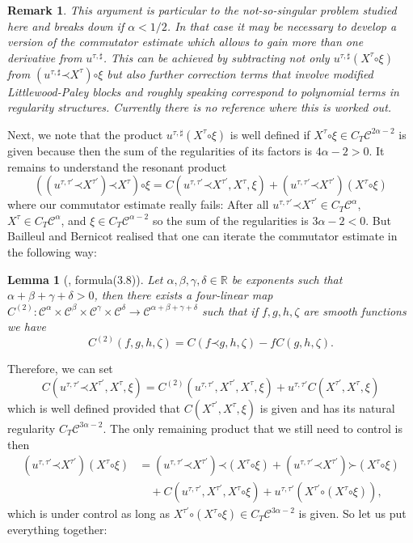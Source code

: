 \documentclass[a4paper, 11pt]{article}
\newtheorem{lemma}[theorem]{Lemma}
\newtheorem{remark}[theorem]{Remark}
\newcommand{\para}{\mathord{\prec}}
\newcommand{\lpara}{\mathord{\succ}}
\newcommand{\reso}{\mathord{\circ}}
\begin{document}
\begin{remark}
  \label{rmk:too-little-gain}This argument is particular to the
  not-so-singular problem studied here and breaks down if $\alpha < 1 / 2$. In
  that case it may be necessary to develop a version of the commutator estimate
  which allows to gain more than one derivative from $u^{\tau, \sharp}$. This
  can be achieved by subtracting not only $u^{\tau, \sharp} (X^{\tau} \reso
  \xi)$ from $(u^{\tau, \sharp} \para X^{\tau}) \reso \xi$ but also further
  correction terms that involve modified Littlewood-Paley blocks
  and roughly speaking correspond to polynomial terms in regularity
  structures. Currently there is no reference where this is worked out.
\end{remark}

Next, we note that the product $u^{\tau, \sharp} (X^{\tau} \reso \xi)$ is
well defined if $X^{\tau} \reso \xi \in C_T \mathcal{C}^{2 \alpha - 2}$ is
given because then the sum of the regularities of its factors is $4 \alpha - 2
> 0$. It remains to understand the resonant product
\[ ((u^{\tau, \tau'} \para X^{\tau'}) \para X^{\tau}) \reso \xi = C (u^{\tau,
   \tau'} \para X^{\tau'}, X^{\tau}, \xi) + (u^{\tau, \tau'} \para X^{\tau'})
   (X^{\tau} \reso \xi) \]
where our commutator estimate really fails: After all $u^{\tau, \tau'} \para X^{\tau'} \in C_T \mathcal{C}^{\alpha}$,
$X^{\tau} \in C_T \mathcal{C}^{\alpha}$, and $\xi \in C_T \mathcal{C}^{\alpha
- 2}$ so the sum of the regularities is $3 \alpha - 2 < 0$. But Bailleul and
Bernicot realised that one can iterate the commutator estimate in the
following way:

\begin{lemma}[\cite{bailleul_higher_2016}, formula(3.8)]  
  Let $\alpha, \beta, \gamma, \delta \in \mathbb{R}$ be exponents such that $\alpha + \beta + \gamma + \delta > 0$, then
  there exists a four-linear map $C^{(2)} : \mathcal{C}^{\alpha} \times
  \mathcal{C}^{\beta} \times \mathcal{C}^{\gamma} \times \mathcal{C}^{\delta}
  \rightarrow \mathcal{C}^{\alpha + \beta + \gamma + \delta}$ such that if $f,
  g, h, \zeta$ are smooth functions we have
  \[ C^{(2)} (f, g, h, \zeta) = C (f \para g, h, \zeta) - f C (g, h, \zeta) .
  \]
\end{lemma}

Therefore, we can set
\[ C (u^{\tau, \tau'} \para X^{\tau'}, X^{\tau}, \xi) = C^{(2)} (u^{\tau,
   \tau'}, X^{\tau'}, X^{\tau}, \xi) + u^{\tau, \tau'} C (X^{\tau'}, X^{\tau},
   \xi) \]
which is well defined provided that $C (X^{\tau'}, X^{\tau}, \xi)$ is given and has its natural
regularity $C_T \mathcal{C}^{3 \alpha - 2}$. The only remaining product that
we still need to control is then
\begin{align*}
  (u^{\tau, \tau'} \para X^{\tau'}) (X^{\tau} \reso \xi) & = (u^{\tau, \tau'}
  \para X^{\tau'}) \para (X^{\tau} \reso \xi) + (u^{\tau, \tau'} \para
  X^{\tau'}) \lpara (X^{\tau} \reso \xi)\\
  & \quad + C (u^{\tau, \tau'}, X^{\tau'}, X^{\tau} \reso \xi) + u^{\tau, \tau'}
  (X^{\tau'} \reso (X^{\tau} \reso \xi)),
\end{align*}
which is under control as long as $X^{\tau'} \reso (X^{\tau} \reso \xi) \in
C_T \mathcal{C}^{3 \alpha - 2}$ is given. So let us put everything together:
\end{document}

